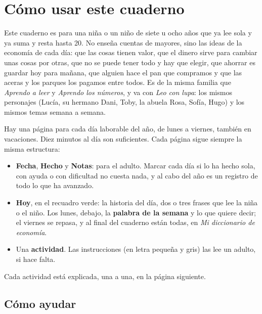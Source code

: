 \section*{Cómo usar este cuaderno}

Este cuaderno es para una niña o un niño de siete u ocho años que ya lee
sola y ya suma y resta hasta 20. No enseña cuentas de mayores, sino las
ideas de la economía de cada día: que las cosas tienen valor, que el
dinero sirve para cambiar unas cosas por otras, que no se puede tener
todo y hay que elegir, que ahorrar es guardar hoy para mañana, que
alguien hace el pan que compramos y que las aceras y los parques los
pagamos entre todos. Es de la misma familia que \emph{Aprendo a leer} y
\emph{Aprendo los números}, y va con \emph{Leo con lupa}: los mismos
personajes (Lucía, su hermano Dani, Toby, la abuela Rosa, Sofía, Hugo)
y los mismos temas semana a semana.

Hay una página para cada día laborable del año, de lunes a viernes,
también en vacaciones. Diez minutos al día son suficientes. Cada página
sigue siempre la misma estructura:

\begin{itemize}[leftmargin=6mm]
\item \textbf{Fecha}, \textbf{Hecho} y \textbf{Notas}: para el adulto.
  Marcar cada día si lo ha hecho sola, con ayuda o con dificultad no
  cuesta nada, y al cabo del año es un registro de todo lo que ha
  avanzado.
\item \textbf{Hoy}, en el recuadro verde: la historia del día, dos o
  tres frases que lee la niña o el niño. Los lunes, debajo, la
  \textbf{palabra de la semana} y lo que quiere decir; el viernes se
  repasa, y al final del cuaderno están todas, en \emph{Mi diccionario
  de economía}.
\item Una \textbf{actividad}. Las instrucciones (en letra pequeña y
  gris) las lee un adulto, si hace falta.
\end{itemize}

Cada actividad está explicada, una a una, en la página siguiente.

\subsection*{Cómo ayudar}

